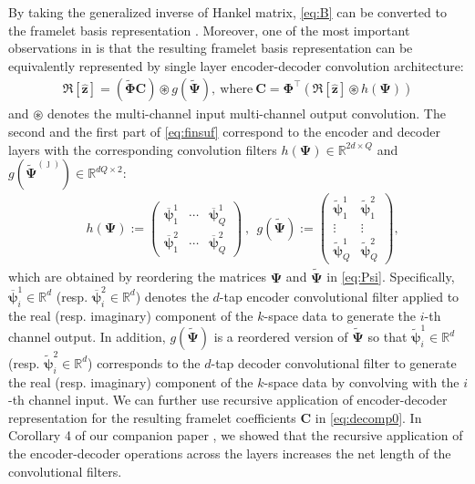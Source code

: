 \documentclass[10pt,journal]{IEEEtran}
\newcommand{\RR}{\mathbb{R}}
\newcommand{\Cb}{{\mathbf{C}}}
\newcommand{\zb}{{\mathbf z}}
\newcommand{\Phib}{{\boldsymbol {\Phi}}}
\newcommand{\Psib}{{\boldsymbol {\Psi}}}
\newcommand{\Rd}{{\mathbb R}}
\newcommand{\psib}{{\boldsymbol{\psi}}}
\newcommand{\0}{{\boldsymbol{0}}}
\newcommand{\Rbc}{{\mathfrak{R}}}
\begin{document}
By taking the generalized inverse of Hankel matrix,  \eqref{eq:B} can be converted
to the framelet basis representation  \cite{ye2017deep}.
Moreover, one of the
most important observations in  \cite{ye2017deep}
is  that  the resulting framelet basis representation  can be equivalently represented by
single layer encoder-decoder convolution architecture:
\begin{eqnarray} \label{eq:decomp0}
\Rbc[\widehat \zb ]= \left(\widetilde\Phib \Cb\right) \circledast g(\tilde \Psib),  ~\mbox{where}~
 \Cb =  \Phib^\top \left(  \Rbc[\widehat \zb ]\circledast  h(\Psib)\right) 
\label{eq:finsuf}
\end{eqnarray}
and  
 $\circledast$ denotes the multi-channel input multi-channel output convolution.
The second and the first part of \eqref{eq:finsuf} correspond to the encoder and decoder layers with the corresponding
 convolution filters  
$h(\Psib) \in\RR^{2d \times Q}$ and $g\left(\widetilde{\Psib}^{(\jmath)}\right)\in\RR^{d Q\times 2}$:
\begin{align*}
&h(\Psib):=
\begin{pmatrix}
\overline\psib^{1}_{1} & \cdots & \overline\psib^{1}_{Q}
\\
\overline\psib^{2}_{1} & \cdots & \overline\psib^{2}_{Q}
\end{pmatrix}
\ , ~~
g\left(\widetilde{\Psib}\right):=
\begin{pmatrix}
\widetilde{\psib}^{1}_{1} & \widetilde{\psib}^{2}_{1}
\\
\vdots & \vdots
\\
\widetilde{\psib}^{1}_{Q} &  \widetilde{\psib}^{2}_{Q}
\end{pmatrix},
\end{align*}
which are obtained by reordering the matrices $\Psib$ and $\widetilde\Psib$ in \eqref{eq:Psi}.
Specifically,  $\overline \psib_i^{1}\in \Rd^{d}$ (resp. $\overline \psib_i^{2}\in \Rd^d$) denotes the $d$-tap
encoder convolutional filter applied to the  real (resp. imaginary) component of the $k$-space data to 
generate the $i$-th channel output.
In addition, $g(\tilde\Psib)$ is a reordered version of $\tilde\Psib$ so that 
 $\tilde \psib_i^{1}\in \Rd^d$ (resp. $\tilde \psib_i^{2}\in \Rd^d$) corresponds to the $d$-tap
decoder convolutional filter to generate the  real (resp. imaginary) component of the  $k$-space data by
convolving with  the $i$-th channel input.
We can further use recursive application of
encoder-decoder representation for the resulting framelet coefficients $\Cb$ in \eqref{eq:decomp0}.
In Corollary 4 of our companion paper \cite{ye2019cnn}, we showed that 
the recursive application of the encoder-decoder
operations across the layers
increases the net length of the convolutional filters. 
\end{document}
